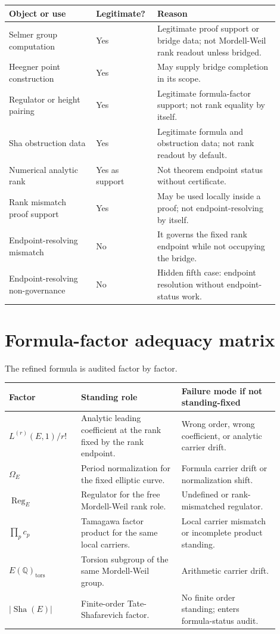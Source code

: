 \documentclass[11pt]{article}
\newcommand{\Q}{\mathbb{Q}}
\newcommand{\Sha}{\operatorname{Sha}}
\newcommand{\Reg}{\operatorname{Reg}}
\newcommand{\tors}{\operatorname{tors}}
\begin{document}
\begin{longtable}{L{0.30\linewidth}L{0.18\linewidth}L{0.42\linewidth}}
\toprule
\textbf{Object or use} & \textbf{Legitimate?} & \textbf{Reason}\\
\midrule
Selmer group computation & Yes & Legitimate proof support or bridge data; not Mordell-Weil rank readout unless bridged.\\
Heegner point construction & Yes & May supply bridge completion in its scope.\\
Regulator or height pairing & Yes & Legitimate formula-factor support; not rank equality by itself.\\
Sha obstruction data & Yes & Legitimate formula and obstruction data; not rank readout by default.\\
Numerical analytic rank & Yes as support & Not theorem endpoint status without certificate.\\
Rank mismatch proof support & Yes & May be used locally inside a proof; not endpoint-resolving by itself.\\
Endpoint-resolving mismatch & No & It governs the fixed rank endpoint while not occupying the bridge.\\
Endpoint-resolving non-governance & No & Hidden fifth case: endpoint resolution without endpoint-status work.\\
\bottomrule
\end{longtable}

\section{Formula-factor adequacy matrix}

The refined formula is audited factor by factor.

\begin{longtable}{L{0.23\linewidth}L{0.34\linewidth}L{0.33\linewidth}}
\toprule
\textbf{Factor} & \textbf{Standing role} & \textbf{Failure mode if not standing-fixed}\\
\midrule
$L^{(r)}(E,1)/r!$ & Analytic leading coefficient at the rank fixed by the rank endpoint. & Wrong order, wrong coefficient, or analytic carrier drift.\\
$\Omega_E$ & Period normalization for the fixed elliptic curve. & Formula carrier drift or normalization shift.\\
$\Reg_E$ & Regulator for the free Mordell-Weil rank role. & Undefined or rank-mismatched regulator.\\
$\prod_p c_p$ & Tamagawa factor product for the same local carriers. & Local carrier mismatch or incomplete product standing.\\
$E(\Q)_{\tors}$ & Torsion subgroup of the same Mordell-Weil group. & Arithmetic carrier drift.\\
$|\Sha(E)|$ & Finite-order Tate-Shafarevich factor. & No finite order standing; enters formula-status audit.\\
\bottomrule
\end{longtable}
\end{document}
